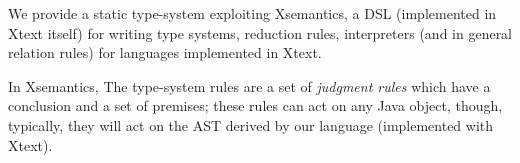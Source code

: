 We provide a static type-system exploiting Xsemantics\cite{xsemantics-site}, a DSL (implemented in Xtext itself) for writing type systems, reduction rules, interpreters (and in general relation rules) for languages implemented in Xtext.

In Xsemantics, The type-system rules are a set of \emph{judgment rules} which have a conclusion and a set of premises; these rules can act on any Java object, though, typically, they will act on the AST derived by our language (implemented with Xtext).